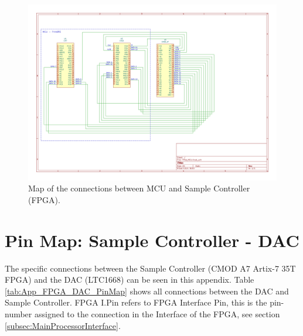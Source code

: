   
\begin{figure}[H]
    \centering
    \includegraphics[clip, trim=40 130 190 40,width=1.0\textwidth]{Appendix/Figures/FPGA_MCU_PinOut.pdf}
    \caption{Map of the connections between MCU and Sample Controller (FPGA).}
    \label{fig_App_MCU_FPGA_PinMap}
\end{figure}


\section{Pin Map: Sample Controller - DAC} \label{App:PinMap_FPGA_DAC}
The specific connections between the Sample Controller (CMOD A7 Artix-7 35T FPGA) and the DAC (LTC1668) can be seen in this appendix. Table \ref{tab:App_FPGA_DAC_PinMap} shows all connections between the DAC and Sample Controller. FPGA I.Pin refers to FPGA Interface Pin, this is the
pin-number assigned to the connection in the Interface of the FPGA, see section \ref{subsec:MainProcessorInterface}. 

